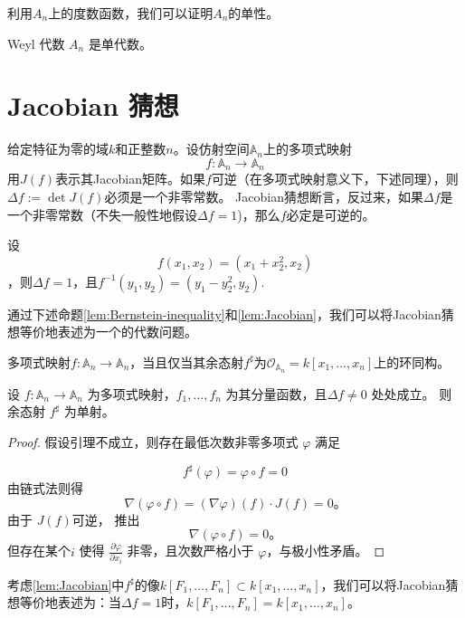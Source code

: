 利用$A_n$上的度数函数，我们可以证明$A_n$的单性。

\begin{theorem}
    \label{thm:simple}
    Weyl 代数 $A_n$ 是单代数。
\end{theorem}
\section{Jacobian 猜想}
给定特征为零的域$k$和正整数$n$。设仿射空间$\mathbb{A}_n$上的多项式映射
\begin{equation*}
    f:\mathbb{A}_n\to \mathbb{A}_n
\end{equation*}
用$J(f)$表示其Jacobian矩阵。如果$f$可逆（在多项式映射意义下，下述同理），则$\Delta f:=\det J(f)$必须是一个非零常数。
Jacobian猜想断言，反过来，如果$\Delta f$是一个非零常数（不失一般性地假设$\Delta f=1$)，那么$f$必定是可逆的。
\begin{example}
    设
    \begin{equation*}
        f(x_1,x_2)=(x_1+x_2^2,x_2)
    \end{equation*}
    ，则$\Delta f=1$，且$f^{-1}(y_1,y_2)=(y_1-y_2^2,y_2)$.
\end{example}

通过下述命题\ref{lem:Bernstein-inequality}和\ref{lem:Jacobian}，我们可以将Jacobian猜想等价地表述为一个的代数问题。
\begin{proposition}
    \label{pro:Jacobian}
    多项式映射$f:\mathbb{A}_n\to \mathbb{A}_n$，当且仅当其余态射$f^\sharp$为$\mathcal{O}_{\mathbb{A}_n}=k[x_1,\dots,x_n]$上的环同构。
\end{proposition}



\begin{lemma}
    \label{lem:Jacobian}
    设 $f: \mathbb{A}_n \to \mathbb{A}_n$ 为多项式映射，$f_1,\dots,f_n$ 为其分量函数，且$\Delta f\neq 0$   处处成立。
    则余态射 $f^\sharp$ 为单射。
\end{lemma}

\begin{proof}
    假设引理不成立，则存在最低次数非零多项式
    $\varphi$
    满足

    \begin{equation*}
        f^\sharp(\varphi)=\varphi\circ f=0
    \end{equation*}
    由链式法则得
    \begin{equation*}
        \nabla (\varphi\circ f)
        =
        (\nabla \varphi)(f)\cdot J(f)=0。
    \end{equation*}
    由于 $J(f)$可逆，
    推出
    \begin{equation*}
        \nabla (\varphi\circ f)=0。
    \end{equation*}
    但存在某个$i$ 使得 $\frac{\partial \varphi}{\partial x_i}$ 非零，且次数严格小于 $\varphi$，与极小性矛盾。
\end{proof}
考虑\ref{lem:Jacobian}中$f^{\sharp}$的像$k[F_1,\dots,F_n]\subset k[x_1,\dots,x_n]$，我们可以将Jacobian猜想等价地表述为：当$\Delta f=1$时，$k[F_1,\dots,F_n]=k[x_1,\dots,x_n]$。

